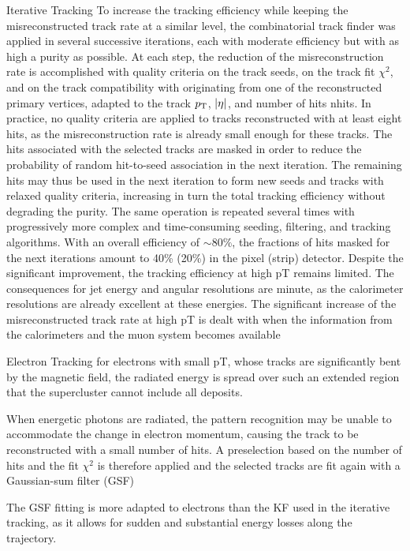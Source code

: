 Iterative Tracking
To increase the tracking efficiency while keeping the misreconstructed track rate at a similar level, the combinatorial track finder was applied in several successive iterations, each with moderate efficiency but with as high a purity as possible. At each step, the reduction of the misreconstruction rate is accomplished with quality criteria on the track seeds, on the track fit $\chi^2$, and on the track compatibility with originating from one of the reconstructed primary vertices, adapted to the track $p_\mathrm{T}$, $\lvert\eta\rvert$, and number of hits nhits. In practice, no quality criteria are applied to tracks reconstructed with at least eight hits, as the misreconstruction rate is already small enough for these tracks. The hits associated with the selected tracks are masked in order to reduce the probability of random hit-to-seed association in the next iteration. The remaining hits may thus be used in the next iteration to form new seeds and tracks with relaxed quality criteria, increasing in turn the total tracking efficiency without degrading the purity. The same operation is repeated several times with progressively more complex and time-consuming seeding, filtering, and tracking algorithms.
With an overall efficiency of $\sim 80\%$, the fractions of hits masked for the next iterations amount to 40\% (20\%) in the pixel (strip) detector.
Despite the significant improvement, the tracking efficiency at high pT remains limited. The consequences for jet energy and angular resolutions are minute, as the calorimeter resolutions are already excellent at these energies. The significant increase of the misreconstructed track rate at high pT is dealt with when the information from the calorimeters and the muon system becomes available


Electron Tracking
for electrons with small pT, whose tracks are significantly bent by the magnetic field, the radiated energy is spread over such an extended region that the supercluster cannot include all deposits.

When energetic photons are radiated, the pattern recognition may be unable to accommodate the change in electron momentum, causing the track to be reconstructed with a small number of hits. A preselection based on the number of hits and the fit $\chi^2$ is therefore applied and the selected tracks are fit again with a Gaussian-sum filter (GSF)

The GSF fitting is more adapted to electrons than the KF used in the iterative tracking, as it allows for sudden and substantial energy losses along the trajectory.

